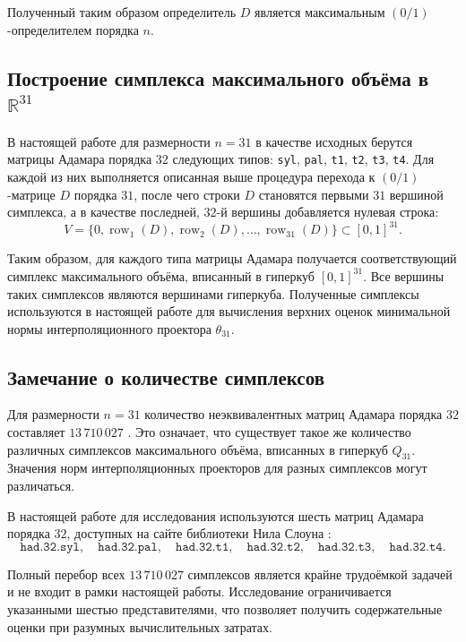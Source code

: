 \documentclass[a4paper,12pt]{article}
\theoremstyle{indented}
\begin{document}
Полученный таким образом определитель $D$ является максимальным $(0/1)$-определителем порядка $n$.

\subsection{Построение симплекса максимального объёма в $\mathbb{R}^{31}$}

В настоящей работе для размерности $n = 31$ в качестве исходных берутся матрицы Адамара порядка $32$ следующих типов: \texttt{syl}, \texttt{pal}, \texttt{t1}, \texttt{t2}, \texttt{t3}, \texttt{t4}. Для каждой из них выполняется описанная выше процедура перехода к $(0/1)$-матрице $D$ порядка $31$, после чего строки $D$ становятся первыми $31$ вершиной симплекса, а в качестве последней, $32$-й вершины добавляется нулевая строка:
\[
V = \{0, \operatorname{row}_1(D), \operatorname{row}_2(D), \dots, \operatorname{row}_{31}(D)\} \subset [0,1]^{31}.
\]

Таким образом, для каждого типа матрицы Адамара получается соответствующий симплекс максимального объёма, вписанный в гиперкуб $[0,1]^{31}$. Все вершины таких симплексов являются вершинами гиперкуба. Полученные симплексы используются в настоящей работе для вычисления верхних оценок минимальной нормы интерполяционного проектора $\theta_{31}$.

\subsection{Замечание о количестве симплексов}

Для размерности $n = 31$ количество неэквивалентных матриц Адамара порядка $32$ составляет $13\,710\,027$ \cite{kharaghani2013hadamard}. Это означает, что существует такое же количество различных симплексов максимального объёма, вписанных в гиперкуб $Q_{31}$. Значения норм интерполяционных проекторов для разных симплексов могут различаться.
\par
В настоящей работе для исследования используются шесть матриц Адамара порядка $32$, доступных на сайте библиотеки Нила Слоуна \cite{sloane_hadamard}:
\[
\texttt{had.32.syl},\quad \texttt{had.32.pal},\quad \texttt{had.32.t1},\quad \texttt{had.32.t2},\quad \texttt{had.32.t3},\quad \texttt{had.32.t4}.
\]

Полный перебор всех $13\,710\,027$ симплексов является крайне трудоёмкой задачей и не входит в рамки настоящей работы. Исследование ограничивается указанными шестью представителями, что позволяет получить содержательные оценки при разумных вычислительных затратах.
\end{document}
